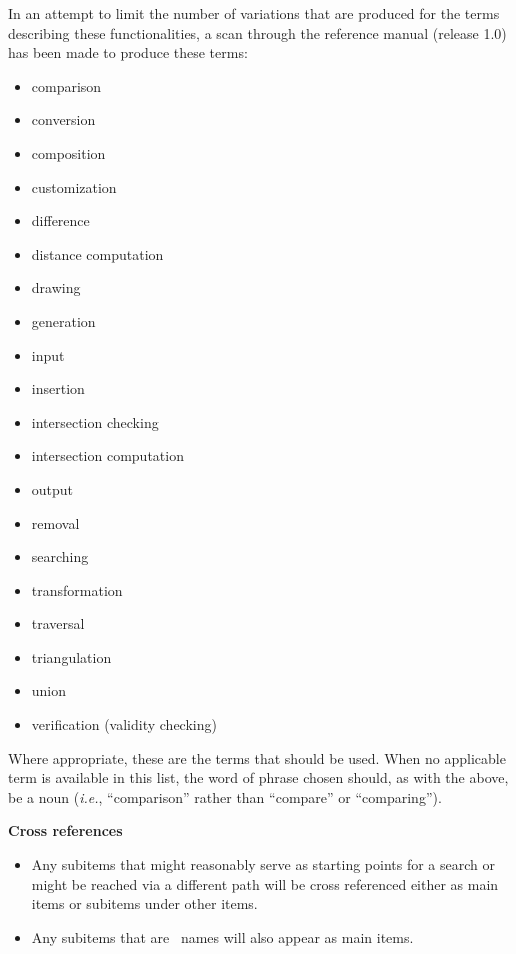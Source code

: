 \documentclass[11pt]{article}
\begin{document}
\begin{description}
        In an attempt to limit the number of variations that are produced
        for the terms describing these functionalities, a scan through the
        reference manual (release 1.0) has been made to produce these
        terms:
        \begin{itemize}
           \item comparison
           \item conversion
           \item composition
           \item customization
           \item difference
           \item distance computation
           \item drawing
           \item generation
           \item input
           \item insertion
           \item intersection checking
           \item intersection computation
           \item output
           \item removal
           \item searching
           \item transformation
           \item traversal
           \item triangulation
           \item union
           \item verification (validity checking)
        \end{itemize}
        Where appropriate, these are the terms that should be used.  When
        no applicable term is available in this list, the word of phrase
        chosen should, as with the above, be a noun ({\it i.e.}, ``comparison''
        rather than ``compare'' or ``comparing'').


   \item{\bf Cross references}
        \begin{itemize}
           \item Any subitems that might reasonably serve as starting points 
                 for a search or might be reached via a different path will
                 be cross referenced either as main items or subitems under
                 other items.
           \item Any subitems that are \CC\ names will also appear as main
                 items.
        \end{itemize}


\end{description}
\end{document}
